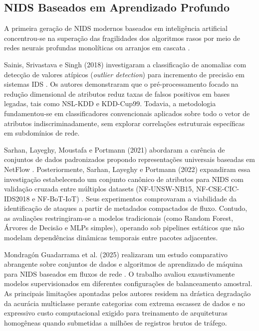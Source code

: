 \subsection{NIDS Baseados em Aprendizado Profundo}
\label{subsec:correlatos_dl}

A primeira geração de NIDS modernos baseados em inteligência artificial concentrou-se na superação das fragilidades dos algoritmos rasos por meio de redes neurais profundas monolíticas ou arranjos em cascata \cite{survey2025dl}.

Sainis, Srivastava e Singh (2018) investigaram a classificação de anomalias com detecção de valores atípicos (\emph{outlier detection}) para incremento de precisão em sistemas IDS \cite{feature2018}. Os autores demonstraram que o pré-processamento focado na redução dimensional de atributos reduz taxas de falsos positivos em bases legadas, tais como NSL-KDD e KDD-Cup99. Todavia, a metodologia fundamentou-se em classificadores convencionais aplicados sobre todo o vetor de atributos indiscriminadamente, sem explorar correlações estruturais específicas em subdomínios de rede.

Sarhan, Layeghy, Moustafa e Portmann (2021) abordaram a carência de conjuntos de dados padronizados propondo representações universais baseadas em NetFlow \cite{netflow2020}. Posteriormente, Sarhan, Layeghy e Portmann (2022) expandiram essa investigação estabelecendo um conjunto canônico de atributos para NIDS com validação cruzada entre múltiplos datasets (NF-UNSW-NB15, NF-CSE-CIC-IDS2018 e NF-BoT-IoT) \cite{standard2021}. Seus experimentos comprovaram a viabilidade da identificação de ataques a partir de metadados compactados de fluxo. Contudo, as avaliações restringiram-se a modelos tradicionais (como Random Forest, Árvores de Decisão e MLPs simples), operando sob pipelines estáticos que não modelam dependências dinâmicas temporais entre pacotes adjacentes.

Mondragón Guadarrama et al. (2025) realizaram um estudo comparativo abrangente sobre conjuntos de dados e algoritmos de aprendizado de máquina para NIDS baseados em fluxos de rede \cite{advancedids2024}. O trabalho avaliou exaustivamente modelos supervisionados em diferentes configurações de balanceamento amostral. As principais limitações apontadas pelos autores residem na drástica degradação da acurácia multiclasse perante categorias com extrema escassez de dados e no expressivo custo computacional exigido para treinamento de arquiteturas homogêneas quando submetidas a milhões de registros brutos de tráfego.

